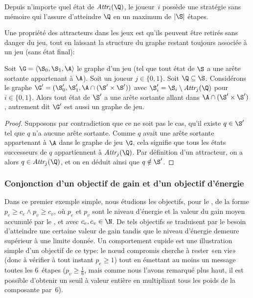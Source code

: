 \begin{lemma}
Depuis n'importe quel état de $\attractor{i}(\Q)$, le joueur~$i$ possède une stratégie sans mémoire qui l'assure d'atteindre $\Q$ en un maximum de $|\S|$ étapes.
\end{lemma}

Une propriété des attracteurs dans les jeux est qu'ils peuvent être retirés sans danger du jeu, tout en laissant la structure du graphe restant toujours associée à un jeu (\cad sans état final):
\begin{lemma}\label{tj:lem:removeattr}
Soit $\G = \langle \S_0, \S_1, \A\rangle$ le graphe d'un jeu (\cad tel que tout état de $\S$ a une arête sortante appartenant à $\A$).
Soit un joueur $j \in \{0,1\}$.
Soit $\Q \subseteq \S$.
Considérons le graphe $\G' = (\S_0', \S_1', \A \cap (\S' \times \S'))$ avec $\S_i' = \S_i \setminus \attractor{j}(\Q)$ pour $i \in \{0,1\}$.
Alors tout état de $\S'$ a une arête sortante allant dans $\A \cap (\S' \times \S')$, autrement dit $\G'$ est aussi un graphe de jeu.
\end{lemma}

\begin{proof}
Supposons par contradiction que ce ne soit pas le cas, \cad qu'il existe $q \in \S'$ tel que $q$ n'a aucune arête sortante.
Comme $q$ avait une arête sortante appartenant à $\A$ dans le graphe de jeu $\G$, cela signifie que tous les états successeurs de $q$ appartiennent à $\attractor{j}(\Q)$.
Par définition d'un attracteur, on a alors $q \in \attractor{j}(\Q)$, et on en déduit ainsi que $q \notin \S'$.
\end{proof}

\subsubsection{Conjonction d'un objectif de gain et d'un objectif d'énergie}

Dans ce premier exemple simple, nous étudions les objectifs, pour le \jo, de la forme $p_e \geq c_e \wedge p_v \geq c_v$, où $p_e$ et $p_v$ sont le niveau d'énergie et la valeur du gain moyen accumulé par le \jo, et avec $c_e, c_v \in \N$.
De tels objectifs se traduisent par le besoin d'atteindre une certaine valeur de gain tandis que le niveau d'énergie demeure supérieur à une limite donnée.
Un comportement cupide est une illustration simple d'un objectif de ce type: le nœud compromis cherche à rester «en vie» (donc à vérifier à tout instant $p_e \geq 1$) tout en émettant au moins un message toutes les 6~étapes ($p_v \geq \frac1{6}$, mais comme nous l'avons remarqué plus haut, il est possible d'obtenir un seuil à valeur entière en multipliant tous les poids de la composante par~6).

